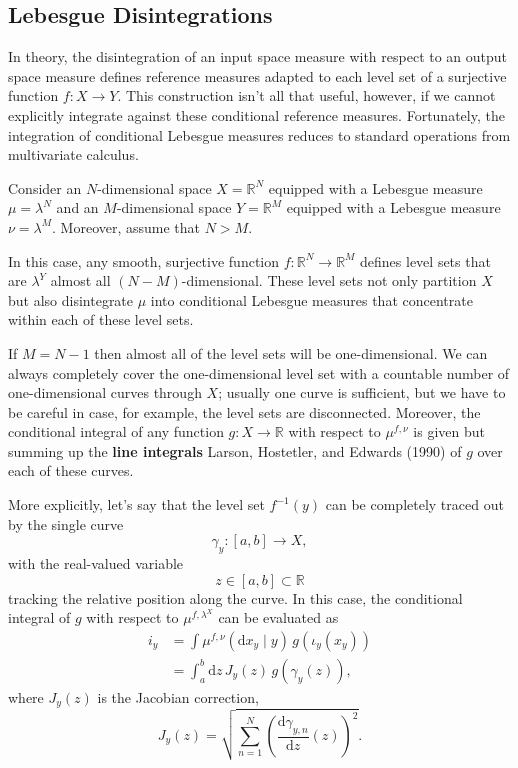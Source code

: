 \documentclass[
  letterpaper,
  DIV=11,
  numbers=noendperiod]{scrartcl}
\begin{document}
\subsection{Lebesgue Disintegrations}\label{sec:leb_disint}

In theory, the disintegration of an input space measure with respect to
an output space measure defines reference measures adapted to each level
set of a surjective function \(f: X \rightarrow Y\). This construction
isn't all that useful, however, if we cannot explicitly integrate
against these conditional reference measures. Fortunately, the
integration of conditional Lebesgue measures reduces to standard
operations from multivariate calculus.

Consider an \(N\)-dimensional space \(X = \mathbb{R}^{N}\) equipped with
a Lebesgue measure \(\mu = \lambda^{N}\) and an \(M\)-dimensional space
\(Y = \mathbb{R}^{M}\) equipped with a Lebesgue measure
\(\nu = \lambda^{M}\). Moreover, assume that \(N > M\).

In this case, any smooth, surjective function
\(f: \mathbb{R}^{N} \rightarrow \mathbb{R}^{M}\) defines level sets that
are \(\lambda^{Y}\) almost all \((N - M)\)-dimensional. These level sets
not only partition \(X\) but also disintegrate \(\mu\) into conditional
Lebesgue measures that concentrate within each of these level sets.

If \(M = N - 1\) then almost all of the level sets will be
one-dimensional. We can always completely cover the one-dimensional
level set with a countable number of one-dimensional curves through
\(X\); usually one curve is sufficient, but we have to be careful in
case, for example, the level sets are disconnected. Moreover, the
conditional integral of any function \(g : X \rightarrow \mathbb{R}\)
with respect to \(\mu^{f, \nu}\) is given but summing up the
\textbf{line integrals} Larson, Hostetler, and Edwards (1990) of \(g\)
over each of these curves.

More explicitly, let's say that the level set \(f^{-1}(y)\) can be
completely traced out by the single curve \[
\gamma_{y} : [a, b] \rightarrow X,
\] with the real-valued variable \[
z \in [a, b] \subset \mathbb{R}
\] tracking the relative position along the curve. In this case, the
conditional integral of \(g\) with respect to \(\mu^{f, \lambda^{X}}\)
can be evaluated as \begin{align*}
i_{y}
&=
\int \mu^{f, \nu}( \mathrm{d}x_{y} \mid y ) \,
g(\iota_{y}(x_{y}))
\\
&=
\int_{a}^{b} \mathrm{d} z \, J_{y}(z) \, g( \gamma_{y}(z) ),
\end{align*} where \(J_{y}(z)\) is the Jacobian correction, \[
J_{y}(z)
=
\sqrt{
  \sum_{n = 1}^{N}
  \left(
    \frac{ \mathrm{d} \gamma_{y, n} }{ \mathrm{d} z } (z)
  \right)^{2}
}.
\]
\end{document}
